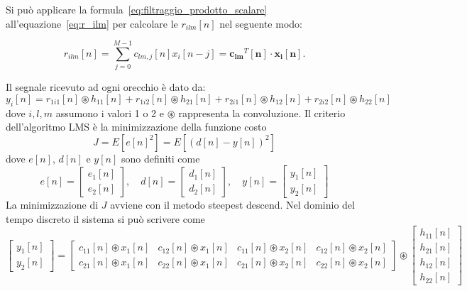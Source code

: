 \documentclass[12pt,a4paper,titlepage]{article}
\begin{document}
Si può applicare la formula~\eqref{eq:filtraggio_prodotto_scalare} all'equazione~\eqref{eq:r_ilm} per calcolare le $r_{ilm}[n]$ nel seguente modo:

\begin{equation}\label{eq:r_ilm_prodotto_scalare}
r_{ilm}[n]=\sum_{j=0}^{M-1}c_{lm,j}[n]x_i[n-j] = \mathbf{c_{lm}}^T[\mathbf{n}] \cdot \mathbf{x_i}[\mathbf{n}].
\end{equation}

Il segnale ricevuto ad ogni orecchio è dato da:
\begin{equation}\label{eq:y_i_lms}
y_i[n]=r_{1i1}[n] \circledast h_{11}[n]+r_{1i2}[n] \circledast h_{21}[n]+
r_{2i1}[n] \circledast h_{12}[n]+r_{2i2}[n] \circledast h_{22}[n]
\end{equation}
dove $i,l,m$ assumono i valori 1 o 2 e $\circledast$ rappresenta la convoluzione. Il criterio dell'algoritmo LMS è la minimizzazione della funzione costo
\begin{equation}\label{eq:errore_lms}
J=E[e[n]^2]=E[(d[n]-y[n])^2]
\end{equation}
dove $e[n]$, $d[n]$ e $y[n]$ sono definiti come
\begin{equation}
e[n]=
\begin{bmatrix}
e_1[n]\\
e_2[n]
\end{bmatrix},\quad
d[n]=
\begin{bmatrix}
d_1[n]\\
d_2[n]
\end{bmatrix},\quad
y[n]=
\begin{bmatrix}
y_1[n]\\
y_2[n]
\end{bmatrix}
\end{equation}
La minimizzazione di $J$ avviene con il metodo steepest descend.
Nel dominio del tempo discreto il sistema si può scrivere come
\begin{equation}\label{eq:y_lms}
\begin{bmatrix}
	y_1[n]     \\
	y_2[n]    
\end{bmatrix}
= 
\begin{bmatrix}
	c_{11}[n] \circledast x_1[n]  &  c_{12}[n] \circledast x_1[n]  & c_{11}[n] \circledast x_2[n]  & c_{12}[n] \circledast x_2[n]    \\
	c_{21}[n] \circledast x_1[n]  &  c_{22}[n] \circledast x_1[n]  & c_{21}[n] \circledast x_2[n]  & c_{22}[n] \circledast x_2[n]     
\end{bmatrix} 
\circledast
\begin{bmatrix}
	h_{11}[n] \\
	h_{21}[n] \\
	h_{12}[n] \\
	h_{22}[n]  
\end{bmatrix}
\end{equation}
\end{document}
